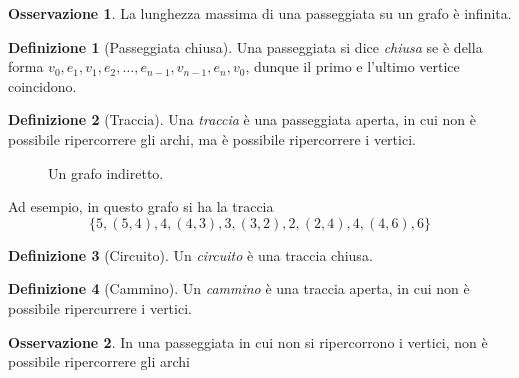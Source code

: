 \documentclass[14pt]{extreport}
\theoremstyle{definition}
\newtheorem{definition}{Definizione}[section]
\theoremstyle{definition}
\newtheorem{remark}{Osservazione}[section]
\begin{document}
\begin{remark}
    La lunghezza massima di una passeggiata su un grafo è infinita.
\end{remark}

\begin{definition}[Passeggiata chiusa]
    Una passeggiata si dice \textit{chiusa} se è della forma $v_0, e_1, v_1, e_2, \ldots , e_{n - 1}, v_{n - 1}, e_n, v_0$, dunque il primo e l'ultimo vertice coincidono. 
\end{definition}

\begin{definition}[Traccia]
    Una \textit{traccia} è una passeggiata aperta, in cui non è possibile ripercorrere gli archi, ma è possibile ripercorrere i vertici.
\end{definition}

\begin{figure}[!htbp]
    \centering
    \caption{Un grafo indiretto.}
\end{figure}

Ad esempio, in questo grafo si ha la traccia $$\{5, (5,4), 4, (4,3), 3, (3, 2), 2, (2,4), 4, (4, 6), 6\}$$

\begin{definition}[Circuito]
    Un \textit{circuito} è una traccia chiusa.
\end{definition}

\begin{definition}[Cammino]
    Un \textit{cammino} è una traccia aperta, in cui non è possibile ripercurrere i vertici.
\end{definition}

\begin{remark}
    In una passeggiata in cui non si ripercorrono i vertici, non è possibile ripercorrere gli archi
\end{remark}
\end{document}
